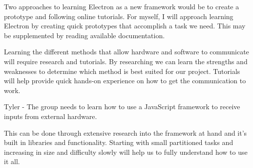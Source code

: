 \documentclass[12pt, titlepage]{article}
\begin{document}
Two approaches to learning Electron as a new framework would be to create a prototype and following online tutorials. For myself, I will approach learning Electron by creating quick prototypes that accomplish a task we need. This may be supplemented by reading available documentation.

Learning the different methods that allow hardware and software to communicate will require research and tutorials. By researching we can learn the strengths and weaknesses to determine which method is best suited for our project. Tutorials will help provide quick hands-on experience on how to get the communication to work.

Tyler - The group needs to learn how to use a JavaScript framework to receive inputs from external hardware. 

This can be done through extensive research into the framework at hand and it's built in libraries and functionality. Starting with small partitioned tasks and increasing in size and difficulty slowly will help us to fully understand how to use it all.
\end{document}
